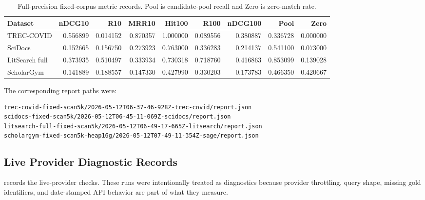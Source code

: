 \documentclass[11pt]{article}
\begin{document}
\begin{table}[t]
\centering
\caption{Full-precision fixed-corpus metric records. Pool is candidate-pool recall and Zero is zero-match rate.}
\label{tab:appendix-fixed-corpus-metric-records}
\scriptsize
\begin{tabular}{@{}l r r r r r r r r@{}}
\toprule
Dataset & nDCG10 & R10 & MRR10 & Hit100 & R100 & nDCG100 & Pool & Zero \\
\midrule
TREC-COVID & 0.556899 & 0.014152 & 0.870357 & 1.000000 & 0.089556 & 0.380887 & 0.336728 & 0.000000 \\
SciDocs & 0.152665 & 0.156750 & 0.273923 & 0.763000 & 0.336283 & 0.214137 & 0.541100 & 0.073000 \\
LitSearch full & 0.373935 & 0.510497 & 0.333934 & 0.730318 & 0.718760 & 0.416863 & 0.853099 & 0.139028 \\
ScholarGym & 0.141889 & 0.188557 & 0.147330 & 0.427990 & 0.330203 & 0.173783 & 0.466350 & 0.420667 \\
\bottomrule
\end{tabular}
\end{table}

The corresponding report paths were:

\begin{lstlisting}[style=pncode]
trec-covid-fixed-scan5k/2026-05-12T06-37-46-928Z-trec-covid/report.json
scidocs-fixed-scan5k/2026-05-12T06-45-11-069Z-scidocs/report.json
litsearch-full-fixed-scan5k/2026-05-12T06-49-17-665Z-litsearch/report.json
scholargym-fixed-scan5k-heap16g/2026-05-12T07-49-11-354Z-sage/report.json
\end{lstlisting}

\subsection{Live Provider Diagnostic Records}

 records the live-provider checks. These runs were intentionally treated as diagnostics because provider throttling, query shape, missing gold identifiers, and date-stamped API behavior are part of what they measure.
\end{document}
